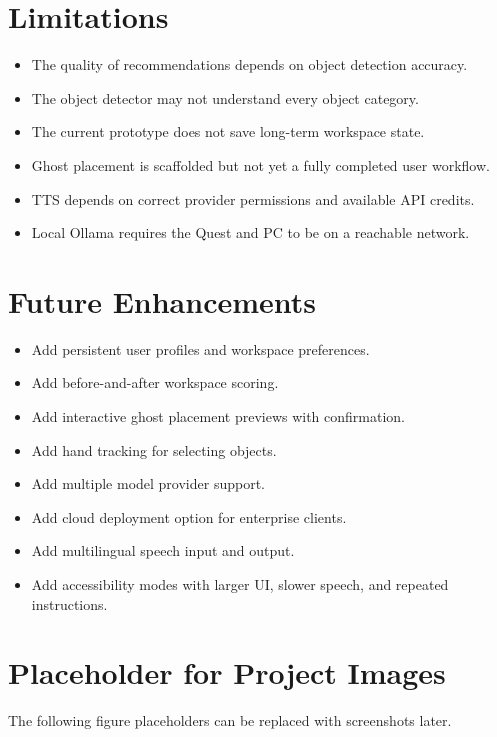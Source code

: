 \documentclass[12pt,a4paper]{article}
\begin{document}
\section{Limitations}

\begin{itemize}
    \item The quality of recommendations depends on object detection accuracy.
    \item The object detector may not understand every object category.
    \item The current prototype does not save long-term workspace state.
    \item Ghost placement is scaffolded but not yet a fully completed user workflow.
    \item TTS depends on correct provider permissions and available API credits.
    \item Local Ollama requires the Quest and PC to be on a reachable network.
\end{itemize}

\section{Future Enhancements}

\begin{itemize}
    \item Add persistent user profiles and workspace preferences.
    \item Add before-and-after workspace scoring.
    \item Add interactive ghost placement previews with confirmation.
    \item Add hand tracking for selecting objects.
    \item Add multiple model provider support.
    \item Add cloud deployment option for enterprise clients.
    \item Add multilingual speech input and output.
    \item Add accessibility modes with larger UI, slower speech, and repeated instructions.
\end{itemize}

\section{Placeholder for Project Images}

The following figure placeholders can be replaced with screenshots later.
\end{document}
